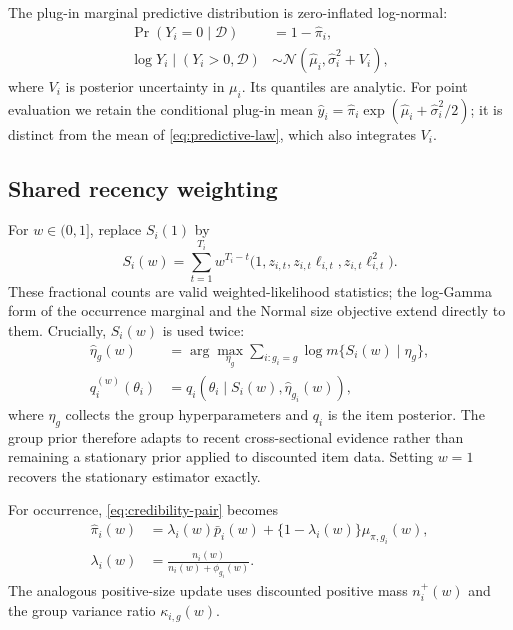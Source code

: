 \documentclass[twoside]{article}
\theoremstyle{definition}
\begin{document}
The plug-in marginal predictive distribution is zero-inflated
log-normal:
\begin{equation}
\begin{aligned}
\Pr(Y_i=0\mid\mathcal D)&=1-\hat\pi_i,\\
\log Y_i\mid(Y_i>0,\mathcal D)
&\sim\mathcal N(\hat\mu_i,\hat\sigma_i^2+V_i),
\end{aligned}
\label{eq:predictive-law}
\end{equation}
where $V_i$ is posterior uncertainty in $\mu_i$. Its quantiles are
analytic. For point evaluation we retain the conditional plug-in mean
$\hat y_i=\hat\pi_i\exp(\hat\mu_i+\hat\sigma_i^2/2)$; it is distinct
from the mean of \eqref{eq:predictive-law}, which also integrates $V_i$.

\subsection{Shared recency weighting}\label{sec:discount}

For $w\in(0,1]$, replace $S_i(1)$ by
\begin{equation}
S_i(w)=\sum_{t=1}^{T_i}w^{T_i-t}
  \bigl(1,z_{i,t},z_{i,t}\ell_{i,t},z_{i,t}\ell_{i,t}^2\bigr).
\label{eq:discounted-stats}
\end{equation}
These fractional counts are valid weighted-likelihood statistics; the
log-Gamma form of the occurrence marginal and the Normal size objective
extend directly to them. Crucially, $S_i(w)$ is used twice:
\begin{equation}
\begin{aligned}
\widehat\eta_g(w)
&=\arg\max_{\eta_g}
  \sum_{i:g_i=g}\log m\{S_i(w)\mid\eta_g\},\\
q_i^{(w)}(\theta_i)
&=q_i\!\left(\theta_i\mid
  S_i(w),\widehat\eta_{g_i}(w)\right),
\end{aligned}
\label{eq:shared-recency}
\end{equation}
where $\eta_g$ collects the group hyperparameters and $q_i$ is the item
posterior. The group prior therefore adapts to recent cross-sectional
evidence rather than remaining a stationary prior applied to discounted
item data. Setting $w=1$ recovers the stationary estimator exactly.

For occurrence, \eqref{eq:credibility-pair} becomes
\begin{equation}
\begin{aligned}
\hat\pi_i(w)
&=\lambda_i(w)\bar p_i(w)
  +\{1-\lambda_i(w)\}\mu_{\pi,g_i}(w),\\
\lambda_i(w)
&=\frac{n_i(w)}{n_i(w)+\phi_{g_i}(w)}.
\end{aligned}
\label{eq:disc-post}
\end{equation}
The analogous positive-size update uses discounted positive mass
$n_i^+(w)$ and the group variance ratio $\kappa_{i,g}(w)$.
\end{document}
